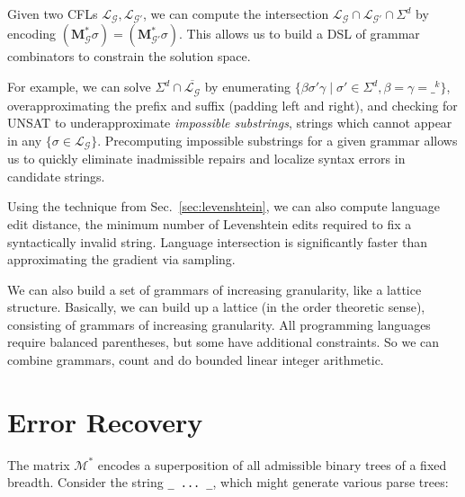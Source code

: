 \documentclass[sigplan,review,anonymous,acmsmall]{acmart}\settopmatter{printfolios=false,printccs=false,printacmref=false}
\begin{document}
Given two CFLs $\mathcal{L}_\mathcal{G}, \mathcal{L}_{\mathcal{G}'}$, we can compute the intersection $\mathcal{L}_\mathcal{G}\cap\mathcal{L}_{\mathcal{G}'}\cap\Sigma^d$ by encoding $(\mathbf{M}_\mathcal{G}^*\sigma) = (\mathbf{M}_{\mathcal{G}'}^*\sigma)$. This allows us to build a DSL of grammar combinators to constrain the solution space.

For example, we can solve $\Sigma^d \cap \overline{\mathcal{L}_\mathcal{G}}$ by enumerating $\{\beta\sigma'\gamma \mid \sigma' \in \Sigma^d, \beta = \gamma = \_^k\}$, overapproximating the prefix and suffix (padding left and right), and checking for UNSAT to underapproximate \textit{impossible substrings}, strings which cannot appear in any $\{\sigma \in \mathcal{L}_\mathcal{G}\}$. Precomputing impossible substrings for a given grammar allows us to quickly eliminate inadmissible repairs and localize syntax errors in candidate strings.

Using the technique from Sec.~\ref{sec:levenshtein}, we can also compute language edit distance, the minimum number of Levenshtein edits required to fix a syntactically invalid string. Language intersection is significantly faster than approximating the gradient via sampling.

We can also build a set of grammars of increasing granularity, like a lattice structure. Basically, we can build up a lattice (in the order theoretic sense), consisting of grammars of increasing granularity. All programming languages require balanced parentheses, but some have additional constraints. So we can combine grammars, count and do bounded linear integer arithmetic.

\pagebreak\section{Error Recovery}\label{sec:error}

The matrix $\mathcal{M}^*$ encodes a superposition of all admissible binary trees of a fixed breadth. Consider the string \texttt{\_ ... \_}, which might generate various parse trees:
\end{document}
